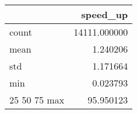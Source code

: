 \begin{tabular}{lr}
\toprule
 & speed_up \\
\midrule
count & 14111.000000 \\
mean & 1.240206 \\
std & 1.171664 \\
min & 0.023793 \\
25%
50%
75%
max & 95.950123 \\
\bottomrule
\end{tabular}
